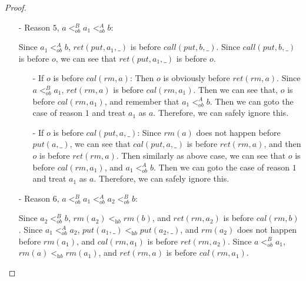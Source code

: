 \documentclass{llncs}
\begin{document}
\begin {proof}
\begin{itemize}
\item[-] Reason $5$, $a <_{\textit{ob}}^B a_1 <_{\textit{ob}}^A b$:

    Since $a_1 <_{\textit{ob}}^A b$, $\textit{ret}(\textit{put},a_1,\_)$ is before $\textit{call}(\textit{put},b,\_)$. Since $\textit{call}(\textit{put},b,\_)$ is before $o$, we can see that $\textit{ret}(\textit{put},a_1,\_)$ is before $o$.

    \begin{itemize}
    \setlength{\itemsep}{0.5pt}
    \item[-] If $o$ is before $\textit{cal}(\textit{rm},a)$: Then $o$ is obviously before $\textit{ret}(\textit{rm},a)$. Since $a <_{\textit{ob}}^B a_1$, $\textit{ret}(\textit{rm},a)$ is before $\textit{cal}(\textit{rm},a_1)$. Then we can see that, $o$ is before $\textit{cal}(\textit{rm},a_1)$, and remember that $a_1 <_{\textit{ob}}^A b$. Then we can goto the case of reason $1$ and treat $a_1$ as $a$. Therefore, we can safely ignore this.

    \item[-] If $o$ is before $\textit{cal}(\textit{put},a,\_)$: Since $\textit{rm}(a)$ does not happen before $\textit{put}(a,\_)$, we can see that $\textit{cal}(\textit{put},a,\_)$ is before $\textit{ret}(\textit{rm},a)$, and then $o$ is before $\textit{ret}(\textit{rm},a)$. Then similarly as above case, we can see that $o$ is before $\textit{cal}(\textit{rm},a_1)$, and $a_1 <_{\textit{ob}}^A b$. Then we can goto the case of reason $1$ and treat $a_1$ as $a$. Therefore, we can safely ignore this.
    \end{itemize}

\item[-] Reason $6$, $a <_{\textit{ob}}^B a_1 <_{\textit{ob}}^A a_2 <_{\textit{ob}}^B b$:

    Since $a_2 <_{\textit{ob}}^B b$, $\textit{rm}(a_2) <_{\textit{hb}} \textit{rm}(b)$, and $\textit{ret}(\textit{rm},a_2)$ is before $\textit{cal}(\textit{rm},b)$. %
    Since $a_1 <_{\textit{ob}}^A a_2$, $\textit{put}(a_1,\_) <_{\textit{hb}} \textit{put}(a_2,\_)$, and $\textit{rm}(a_2)$ does not happen before $\textit{rm}(a_1)$, and $\textit{cal}(\textit{rm},a_1)$ is before $\textit{ret}(\textit{rm},a_2)$. Since $a <_{\textit{ob}}^B a_1$, $\textit{rm}(a) <_{\textit{hb}} \textit{rm}(a_1)$, and $\textit{ret}(\textit{rm},a)$ is before $\textit{cal}(\textit{rm},a_1)$.


\end{itemize}
\end{proof}
\end{document}
